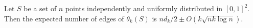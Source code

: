 \documentclass{patmorin}
\begin{document}

\begin{lem}
 Let $S$ be a set of $n$ points independently and uniformly distributed
 in $[0,1]^2$.  Then the expected number of edges of $\theta_k(S)$ is 
 $nd_k/2\pm O(k\sqrt{nk\log n})$.
\end{lem}
\end{document}
